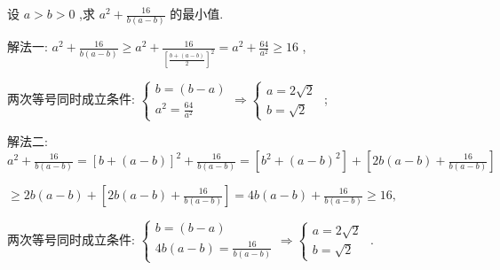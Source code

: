 \documentclass[11pt,a4paper]{article}
\begin{document}
\begin{problem} 
设 \(\displaystyle a > b > 0\) ,求 \(\displaystyle {a}^{2} + \frac{16}{b\left( {a - b}\right) }\) 的最小值.

\begin{jiexi}[45]
    解法一: \(\displaystyle {a}^{2} + \frac{16}{b\left( {a - b}\right) } \geq  {a}^{2} + \frac{16}{{\left\lbrack  \frac{b + \left( {a - b}\right) }{2}\right\rbrack  }^{2}} = {a}^{2} + \frac{64}{{a}^{2}} \geq  {16}\) ,

两次等号同时成立条件: \(\displaystyle \left\{  {\begin{array}{l} b = \left( {b - a}\right) \\  {a}^{2} = \frac{64}{{a}^{2}} \end{array} \Rightarrow  \left\{  \begin{array}{l} a = 2\sqrt{2} \\  b = \sqrt{2} \end{array}\right. }\right.\) ;

解法二: \(\displaystyle {a}^{2} + \frac{16}{b\left( {a - b}\right) } = {\left\lbrack  b + \left( a - b\right) \right\rbrack  }^{2} + \frac{16}{b\left( {a - b}\right) } = \left\lbrack  {{b}^{2} + {\left( a - b\right) }^{2}}\right\rbrack   + \left\lbrack  {{2b}\left( {a - b}\right)  + \frac{16}{b\left( {a - b}\right) }}\right\rbrack\)

\(\displaystyle \geq  {2b}\left( {a - b}\right)  + \left\lbrack  {{2b}\left( {a - b}\right)  + \frac{16}{b\left( {a - b}\right) }}\right\rbrack   = {4b}\left( {a - b}\right)  + \frac{16}{b\left( {a - b}\right) } \geq  {16},\)

两次等号同时成立条件: \(\displaystyle \left\{  {\begin{array}{l} b = \left( {b - a}\right) \\  {4b}\left( {a - b}\right)  = \frac{16}{b\left( {a - b}\right) } \end{array} \Rightarrow  \left\{  \begin{array}{l} a = 2\sqrt{2} \\  b = \sqrt{2} \end{array}\right. }\right.\) .


\end{jiexi}
\end{problem}
\end{document}

